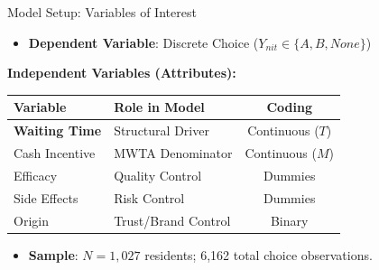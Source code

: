 \documentclass[10pt]{beamer}
\begin{document}
\begin{frame}{Model Setup: Variables of Interest}
    \begin{itemize}
        \item \textbf{Dependent Variable}: Discrete Choice ($Y_{nit} \in \{A, B, None\}$)
    \end{itemize}
    
    \vspace{0.4cm}
    
    \textbf{Independent Variables (Attributes):}
    \begin{table}[]
        \centering
        \small
        \begin{tabular}{llc}
            \toprule
            Variable & Role in Model & Coding \\
            \midrule
            \textbf{Waiting Time} & \alert{Structural Driver} & Continuous ($T$) \\
            Cash Incentive & MWTA Denominator & Continuous ($M$) \\
            Efficacy & Quality Control & Dummies \\
            Side Effects & Risk Control & Dummies \\
            Origin & Trust/Brand Control & Binary \\
            \bottomrule
        \end{tabular}
    \end{table}
    
    \vfill
    \begin{itemize}
        \item \textbf{Sample}: $N=1,027$ residents; 6,162 total choice observations.
    \end{itemize}
\end{frame}
\end{document}
